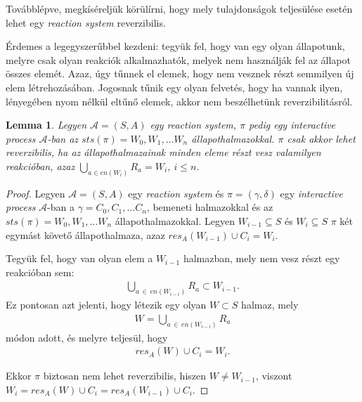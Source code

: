 \documentclass[12pt]{article}
\theoremstyle{definition}
\theoremstyle{remark}
\theoremstyle{plain}
\theoremstyle{remark}
\theoremstyle{plain}
\newtheorem{lemma}{Lemma}
\newcommand{\res}{\textit{res}}
\begin{document}
    Továbblépve, megkíséreljük körülírni, hogy mely tulajdonságok teljesülése esetén lehet egy \textit{reaction system} reverzibilis.

    Érdemes a legegyszerűbbel kezdeni: tegyük fel, hogy van egy olyan állapotunk, melyre csak olyan reakciók alkalmazhatók, melyek nem használják fel az állapot összes elemét. Azaz, úgy tűnnek el elemek, hogy nem vesznek részt semmilyen új elem létrehozásában. Jogosnak tűnik egy olyan felvetés, hogy ha vannak ilyen, lényegében nyom nélkül eltűnő elemek, akkor nem beszélhetünk reverzibilitásról.

    \begin{lemma}\label{lem:no-disappearing-elements}
        Legyen $\mathscr{A} = (S, A)$ egy \textit{reaction system}, $\pi$ pedig egy \textit{interactive process} $\mathscr{A}$-ban az $\textit{sts}(\pi)=W_{0},W_{1},\ldots W_{n}$ állapothalmazokkal. $\pi$ csak akkor lehet reverzibilis, ha az állapothalmazainak minden eleme részt vesz valamilyen reakcióban, azaz $\bigcup_{a \in \textit{en}(W_{i})} R_{a} = W_{i}$, $i \leq n$.
    \end{lemma}

    \begin{proof}
        Legyen $\mathscr{A} = (S, A)$ egy \textit{reaction system} és $\pi=(\gamma, \delta)$ egy \textit{interactive process} $\mathscr{A}$-ban a $\gamma = C_{0}, C_{1}, \ldots C_{n}$, bemeneti halmazokkal és az $\textit{sts}(\pi)=W_{0},W_{1},\ldots W_{n}$ állapothalmazokkal. Legyen $W_{i - 1} \subseteq S$ és $W_{i} \subseteq S$ $\pi$ két egymást követő állapothalmaza, azaz $\res_{A}(W_{i-1}) \cup C_{i}=W_{i}$.
        
        Tegyük fel, hogy van olyan elem a $W_{i-1}$ halmazban, mely nem vesz részt egy reakcióban sem:
        \begin{align*}
            \bigcup_{a \,\in\, \textit{en}(W_{i-i})} R_{a} \subset W_{i-1}.
        \end{align*}
        Ez pontosan azt jelenti, hogy létezik egy olyan $W \subset S$ halmaz, mely
        \begin{align*}
            W = \bigcup_{a \,\in\, \textit{en}(W_{i-i})} R_{a}
        \end{align*}
        módon adott, és melyre teljesül, hogy
        \begin{align*}
            \res_{A}(W) \cup C_{i} = W_{i}.
        \end{align*}

        Ekkor $\pi$ biztosan nem lehet reverzibilis, hiszen $W \neq W_{i - 1}$, viszont $W_{i} = \res_{A}(W) \cup C_{i} = \res_{A}(W_{i - 1}) \cup C_{i}$.
    \end{proof}
\end{document}
